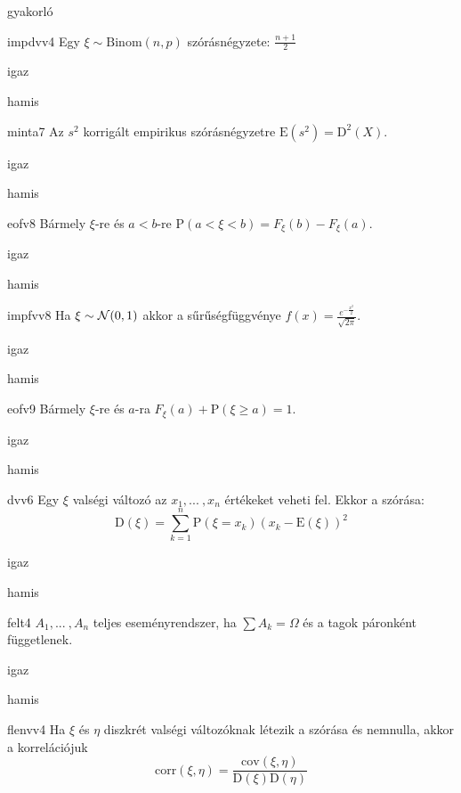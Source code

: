\documentclass[12pt]{article}
\begin{document}
\begin{quiz}{gyakorló}
\begin{multi}[feedback={$\xi=\xi_1+{...\:}+\xi_n$, ahol $\xi_k$ Bernoulli és $\mathrm{D}^2(\xi_k)=p(1-p)$+$\mathrm{D}^2$-additívitása(függetlenség esetén)}]{impdvv4}
Egy $\xi\sim \mathrm{Binom}(n,p)$ szórásnégyzete: $\frac{n+1}{2}$
\item igaz
\item* hamis
\end{multi}
\begin{multi}[feedback={Az $s^2$ torzítatlan becslése a sokasági (elméleti) szórásnégyzetnek}]{minta7}
Az $s^2$ korrigált empirikus szórásnégyzetre $\mathrm{E}(s^2)=\mathrm{D}^2(X)$.
\item* igaz
\item hamis
\end{multi}
\begin{multi}[feedback={Diszkrét v.v.-ra ez nem feltétlen igaz, ha $a$-t pozitív valséggel felveszi.}]{eofv8}
Bármely $\xi$-re és $a<b$-re $\mathrm{P}(a< \xi <b)=F_{\xi}(b)-F_{\xi}(a)$.
\item igaz
\item* hamis
\end{multi}
\begin{multi}[feedback={Def.}]{impfvv8}
Ha $\xi\sim {\cal N}(0,1)$ akkor a sűrűségfüggvénye $f(x)=\frac{e^{-\frac{x^2}{2}}}{\sqrt{2\pi}}$.
\item* igaz
\item hamis
\end{multi}
\begin{multi}[feedback={Komplementer események.}]{eofv9}
Bármely $\xi$-re és $a$-ra $F_{\xi}(a)+\mathrm{P}(\xi\ge a)=1$.
\item* igaz
\item hamis
\end{multi}
\begin{multi}[feedback={Def.}]{dvv6}
Egy $\xi$ valségi változó az $x_1,{...\:}, x_n$ értékeket veheti fel. Ekkor a szórása:
$$
\mathrm{D}(\xi)=\sum_{k=1}^n \mathrm{P}(\xi=x_k)(x_k-\mathrm{E}(\xi))^2
$$
\item igaz
\item* hamis
\end{multi}
\begin{multi}[feedback={Def.}]{felt4}
$A_1,{...\:},A_n$ teljes eseményrendszer, ha $\sum A_k=\Omega$ és a tagok páronként függetlenek.
\item igaz
\item* hamis
\end{multi}
\begin{multi}[feedback={Def.}]{flenvv4}
Ha $\xi$ és $\eta$ diszkrét valségi változóknak létezik a szórása és nemnulla, akkor a 
korrelációjuk
$$
\mathrm{corr}(\xi,\eta)=\frac{\mathrm{cov}(\xi,\eta)}{\mathrm{D}(\xi)\mathrm{D}(\eta)}
$$
\end{multi}
\end{quiz}
\end{document}
